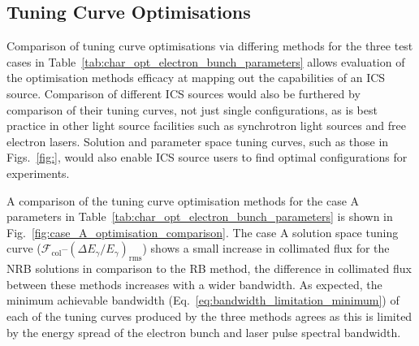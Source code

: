 \documentclass[../main.tex]{subfiles}
\begin{document}
\subsection{Tuning Curve Optimisations}

Comparison of tuning curve optimisations via differing methods for the three test cases in Table~\ref{tab:char_opt_electron_bunch_parameters} allows evaluation of the optimisation methods efficacy at mapping out the capabilities of an ICS source. Comparison of different ICS sources would also be furthered by comparison of their tuning curves, not just single configurations, as is best practice in other light source facilities such as synchrotron light sources and free electron lasers. Solution and parameter space tuning curves, such as those in Figs.~\ref{fig:}, would also enable ICS source users to find optimal configurations for experiments. 

A comparison of the tuning curve optimisation methods for the case A parameters in Table~\ref{tab:char_opt_electron_bunch_parameters} is shown in Fig.~\ref{fig:case_A_optimisation_comparison}. The case A solution space tuning curve ($\mathcal{F}_{\mathrm{col}}$--$\left(\Delta E_{\gamma}/E_{\gamma}\right)_{\mathrm{rms}}$) shows a small increase in collimated flux for the NRB solutions in comparison to the RB method, the difference in collimated flux between these methods increases with a wider bandwidth. As expected, the minimum achievable bandwidth (Eq.~\ref{eq:bandwidth_limitation_minimum}) of each of the tuning curves produced by the three methods agrees as this is limited by the energy spread of the electron bunch and laser pulse spectral bandwidth.
\end{document}
